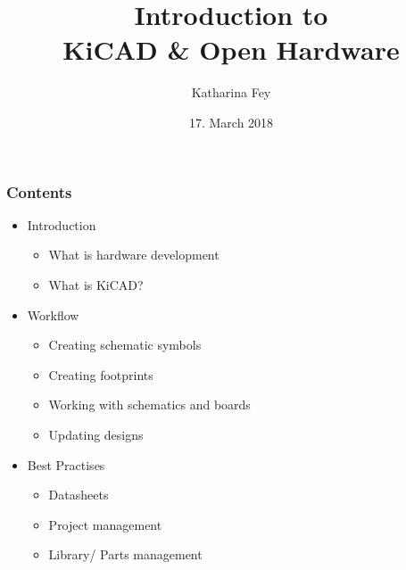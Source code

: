\documentclass{beamer}
\begin{document}
\title{Introduction to\\KiCAD \& Open Hardware}
\author{Katharina Fey}
\date{17. March 2018}

\frame{\titlepage}


\begin{frame}
  \frametitle{Contents}
  \begin{itemize}
    \item Introduction
    \begin{itemize}
      \item What is hardware development
      \item What is KiCAD?
    \end{itemize}
    \item Workflow
    \begin{itemize}
      \item Creating schematic symbols
      \item Creating footprints
      \item Working with schematics and boards
      \item Updating designs
    \end{itemize}
    \item Best Practises
    \begin{itemize}
      \item Datasheets
      \item Project management
      \item Library/ Parts management
    \end{itemize}
  \end{itemize}
\end{frame}
\end{document}
